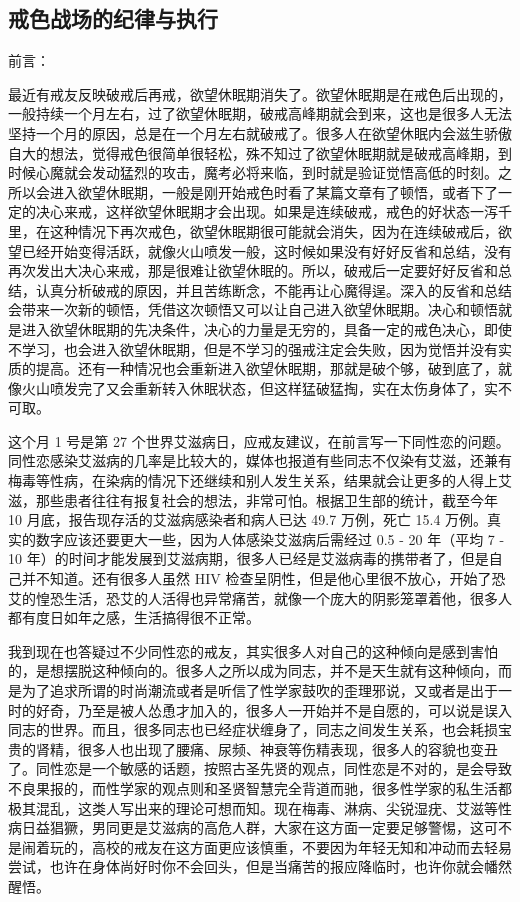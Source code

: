 \subsection{戒色战场的纪律与执行}

前言：

最近有戒友反映破戒后再戒，欲望休眠期消失了。欲望休眠期是在戒色后出现的，一般持续一个月左右，过了欲望休眠期，破戒高峰期就会到来，这也是很多人无法坚持一个月的原因，总是在一个月左右就破戒了。很多人在欲望休眠内会滋生骄傲自大的想法，觉得戒色很简单很轻松，殊不知过了欲望休眠期就是破戒高峰期，到时候心魔就会发动猛烈的攻击，魔考必将来临，到时就是验证觉悟高低的时刻。之所以会进入欲望休眠期，一般是刚开始戒色时看了某篇文章有了顿悟，或者下了一定的决心来戒，这样欲望休眠期才会出现。如果是连续破戒，戒色的好状态一泻千里，在这种情况下再次戒色，欲望休眠期很可能就会消失，因为在连续破戒后，欲望已经开始变得活跃，就像火山喷发一般，这时候如果没有好好反省和总结，没有再次发出大决心来戒，那是很难让欲望休眠的。所以，破戒后一定要好好反省和总结，认真分析破戒的原因，并且苦练断念，不能再让心魔得逞。深入的反省和总结会带来一次新的顿悟，凭借这次顿悟又可以让自己进入欲望休眠期。决心和顿悟就是进入欲望休眠期的先决条件，决心的力量是无穷的，具备一定的戒色决心，即使不学习，也会进入欲望休眠期，但是不学习的强戒注定会失败，因为觉悟并没有实质的提高。还有一种情况也会重新进入欲望休眠期，那就是破个够，破到底了，就像火山喷发完了又会重新转入休眠状态，但这样猛破猛掏，实在太伤身体了，实不可取。

这个月 1 号是第 27 个世界艾滋病日，应戒友建议，在前言写一下同性恋的问题。同性恋感染艾滋病的几率是比较大的，媒体也报道有些同志不仅染有艾滋，还兼有梅毒等性病，在染病的情况下还继续和别人发生关系，结果就会让更多的人得上艾滋，那些患者往往有报复社会的想法，非常可怕。根据卫生部的统计，截至今年 10 月底，报告现存活的艾滋病感染者和病人已达 49.7 万例，死亡 15.4 万例。真实的数字应该还要更大一些，因为人体感染艾滋病后需经过 0.5 - 20 年（平均 7 - 10 年）的时间才能发展到艾滋病期，很多人已经是艾滋病毒的携带者了，但是自己并不知道。还有很多人虽然 HIV 检查呈阴性，但是他心里很不放心，开始了恐艾的惶恐生活，恐艾的人活得也异常痛苦，就像一个庞大的阴影笼罩着他，很多人都有度日如年之感，生活搞得很不正常。

我到现在也答疑过不少同性恋的戒友，其实很多人对自己的这种倾向是感到害怕的，是想摆脱这种倾向的。很多人之所以成为同志，并不是天生就有这种倾向，而是为了追求所谓的时尚潮流或者是听信了性学家鼓吹的歪理邪说，又或者是出于一时的好奇，乃至是被人怂恿才加入的，很多人一开始并不是自愿的，可以说是误入同志的世界。而且，很多同志也已经症状缠身了，同志之间发生关系，也会耗损宝贵的肾精，很多人也出现了腰痛、尿频、神衰等伤精表现，很多人的容貌也变丑了。同性恋是一个敏感的话题，按照古圣先贤的观点，同性恋是不对的，是会导致不良果报的，而性学家的观点则和圣贤智慧完全背道而驰，很多性学家的私生活都极其混乱，这类人写出来的理论可想而知。现在梅毒、淋病、尖锐湿疣、艾滋等性病日益猖獗，男同更是艾滋病的高危人群，大家在这方面一定要足够警惕，这可不是闹着玩的，高校的戒友在这方面更应该慎重，不要因为年轻无知和冲动而去轻易尝试，也许在身体尚好时你不会回头，但是当痛苦的报应降临时，也许你就会幡然醒悟。

